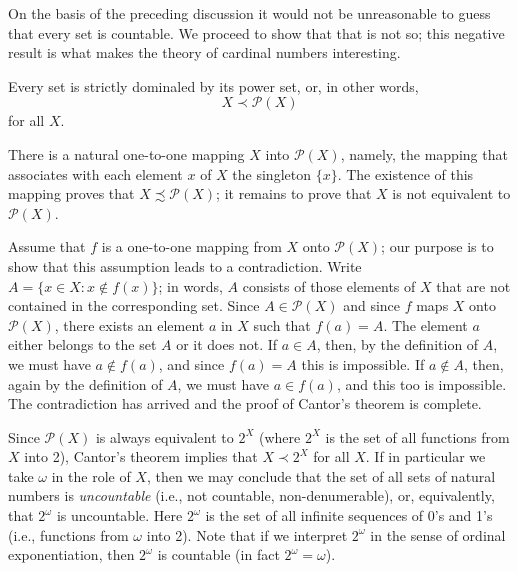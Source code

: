 On the basis of the preceding discussion it would not be unreasonable to guess that every set is countable. We proceed to show that that is not so; this negative result is what makes the theory of cardinal numbers interesting.

\newpage

\begin{samepage}
\begin{named} Every set is strictly dominaled by its power set, or, in other words, 
\begin{equation*}
X \prec \mathcal{P}(X)
\end{equation*}
for all $X$. 
\end{named}
\end{samepage}

\subtitle{Proof} There is a natural one-to-one mapping $X$ into $\mathcal{P}(X)$, namely, the mapping that associates with each element $x$ of $X$ the singleton $\{ x \}$. The existence of this mapping proves that $X \precsim \mathcal{P}(X)$; it remains to prove that $X$ is not equivalent to $\mathcal{P}(X)$. 

Assume that $f$ is a one-to-one mapping from $X$ onto $\mathcal{P}(X)$; our purpose is to show that this assumption  leads to a contradiction. Write $A = \{ x \in X: x \notin f(x) \}$; in words, $A$ consists of those elements of $X$ that are not contained in the corresponding set. Since $A \in \mathcal{P}(X)$ and since $f$ maps $X$ onto $\mathcal{P}(X)$, there exists an element $a$ in $X$ such that $f(a) = A$. The element $a$ either belongs to the set $A$ or it does not. If $a \in A$, then, by the definition of $A$, we must have $a \notin f(a)$, and since $f(a) = A$ this is impossible. If $a \notin A$, then, again by the definition of $A$, we must have $a \in f(a)$, and this too is impossible. The contradiction has arrived and the proof of Cantor's theorem is complete.

Since $\mathcal{P}(X)$ is always equivalent to $2^{X}$ (where $2^{X}$ is the set of all functions from $X$ into 2), Cantor's theorem implies that $X \prec 2^{X}$ for all $X$. If in particular we take $\omega$ in the role of $X$, then we may conclude that the set of all sets of natural numbers is \textit{uncountable} (i.e., not countable, non-denumerable), or, equivalently, that $2^{\omega}$ is uncountable. Here $2^{\omega}$ is the set of all infinite sequences of 0's and 1's (i.e., functions from $\omega$ into 2). Note that if we interpret $2^{\omega}$ in the sense of ordinal exponentiation, then $2^{\omega}$ is countable (in fact $2^{\omega} = \omega$).